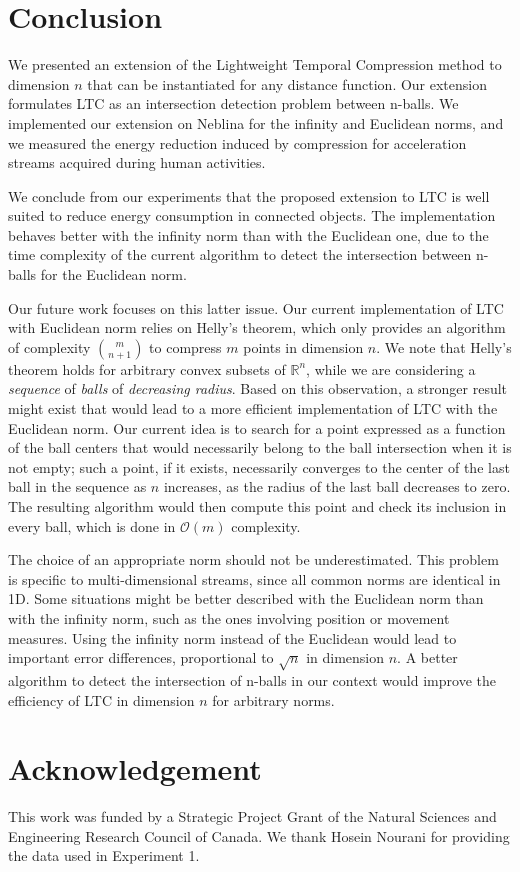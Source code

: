 \documentclass[10pt, conference, compsocconf]{IEEEtran}
\begin{document}


\section{Conclusion}

We presented an extension of the Lightweight Temporal Compression 
method to dimension $n$ that can be instantiated for any distance 
function. Our extension formulates LTC as an intersection detection 
problem between n-balls. We implemented our extension on Neblina for the 
infinity and Euclidean norms, and we measured the energy reduction 
induced by compression for acceleration streams acquired during
 human activities.

We conclude from our experiments that the proposed extension to LTC is 
well suited to reduce energy consumption in connected objects. The implementation 
behaves better with the infinity norm than with the Euclidean one, due 
to the time complexity of the current algorithm to detect the intersection 
between n-balls for the Euclidean norm.

Our future work focuses on this latter issue. Our current 
implementation of LTC with Euclidean norm relies on Helly's theorem, 
which only provides an algorithm of complexity ${m \choose n+1}$ to 
compress $m$ points in 
dimension $n$. We note that Helly's theorem holds for arbitrary convex 
subsets of $\mathbb{R}^n$, while we are considering a \emph{sequence} 
of \emph{balls} of \emph{decreasing radius}. Based on this 
observation, a stronger result might exist that would lead to a more 
efficient implementation of LTC with the Euclidean norm. Our current 
idea is to search for a point expressed as a function of the ball centers that would 
necessarily belong to the ball intersection when it is not empty; such 
a point, if it exists, necessarily converges to the center of the last 
ball in the sequence as $n$ increases, as the radius of the last ball 
decreases to zero. The resulting algorithm would then compute this 
point and check its inclusion in every ball, which is done in 
$\mathcal{O}(m)$ complexity.

The choice of an appropriate norm should not be underestimated. This problem 
is specific to multi-dimensional streams, since all common norms are 
identical in 1D. Some situations might be better described with the 
Euclidean norm than with the infinity norm, such as the ones involving 
position or movement measures. Using the infinity norm instead of the 
Euclidean would lead to important error differences, proportional to 
$\sqrt{n}$ in dimension $n$. A better algorithm to detect the 
intersection of n-balls in our context would improve the efficiency of LTC
in dimension $n$ for arbitrary norms.

\section*{Acknowledgement}
This work was funded by a Strategic Project Grant of the Natural 
Sciences and Engineering Research Council of Canada. We thank Hosein 
Nourani for providing the data used in Experiment 1.



\end{document}
